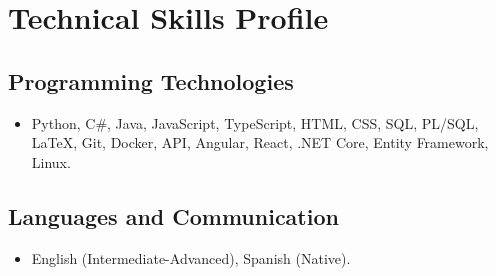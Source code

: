 \section*{\textbf{Technical Skills Profile}}

\subsection*{\textbf{Programming Technologies}}
\begin{itemize}
    \item Python, C\#, Java, JavaScript, TypeScript, HTML, CSS, SQL, PL/SQL, LaTeX, Git, Docker, API, Angular, React, .NET Core, Entity Framework, Linux.
\end{itemize}

\subsection*{\textbf{Languages and Communication}}
\begin{itemize}
    \item English (Intermediate-Advanced), Spanish (Native).
\end{itemize}
